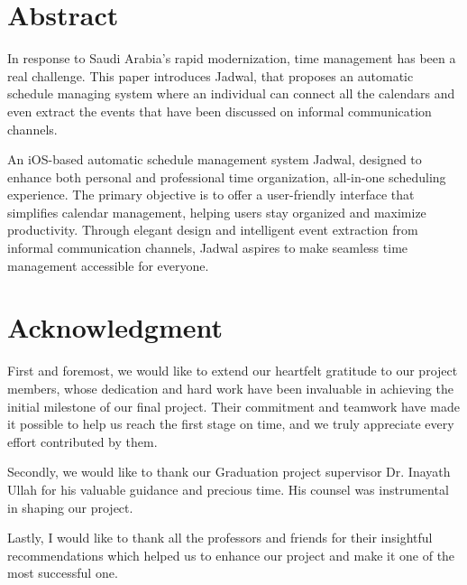 \documentclass[12pt,a4paper]{report}
\begin{document}
\begin{singlespace}

\chapter*{Abstract}
    
\begin{justify}
In response to Saudi Arabia's rapid modernization, time management has been a real challenge. This paper introduces Jadwal, that proposes an automatic schedule managing system where an individual can connect all the calendars and even extract the events that have been discussed on informal communication channels.
    
An iOS-based automatic schedule management system Jadwal, designed to enhance both personal and professional time organization, all-in-one scheduling experience. The primary objective is to offer a user-friendly interface that simplifies calendar management, helping users stay organized and maximize productivity. Through elegant design and intelligent event extraction from informal communication channels, Jadwal aspires to make seamless time management accessible for everyone.
\end{justify}
    
\chapter*{Acknowledgment}
    
\begin{justify}
First and foremost, we would like to extend our heartfelt gratitude to our project members, whose dedication and hard work have been invaluable in achieving the initial milestone of our final project. Their commitment and teamwork have made it possible to help us reach the first stage on time, and we truly appreciate every effort contributed by them.
    
Secondly, we would like to thank our Graduation project supervisor Dr. Inayath Ullah for his valuable guidance and precious time. His counsel was instrumental in shaping our project.
    
Lastly, I would like to thank all the professors and friends for their insightful recommendations which helped us to enhance our project and make it one of the most successful one.
\end{justify}
    

\end{singlespace}
\end{document}

